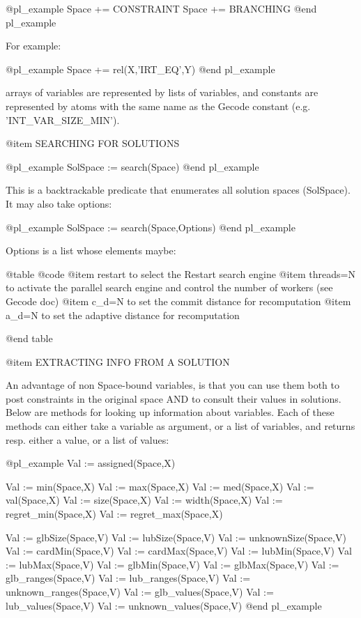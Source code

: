 @pl_example
    Space += CONSTRAINT
    Space += BRANCHING
@end pl_example

For example:

@pl_example
    Space += rel(X,'IRT_EQ',Y)
@end pl_example


arrays of variables are represented by lists of variables, and constants are
represented by atoms with the same name as the Gecode constant
(e.g. 'INT_VAR_SIZE_MIN').

@item SEARCHING FOR SOLUTIONS

@pl_example
    SolSpace := search(Space)
@end pl_example


This is a backtrackable predicate that enumerates all solution spaces
(SolSpace).  It may also take options:

@pl_example
    SolSpace := search(Space,Options)
@end pl_example


Options is a list whose elements maybe:

@table @code
@item restart
    to select the Restart search engine
@item threads=N
    to activate the parallel search engine and control the number of
    workers (see Gecode doc)
@item c_d=N
    to set the commit distance for recomputation
@item a_d=N
    to set the adaptive distance for recomputation

@end table

@item EXTRACTING INFO FROM A SOLUTION

An advantage of non Space-bound variables, is that you can use them both to
post constraints in the original space AND to consult their values in
solutions.  Below are methods for looking up information about variables.  Each
of these methods can either take a variable as argument, or a list of
variables, and returns resp. either a value, or a list of values:

@pl_example
    Val := assigned(Space,X)

    Val := min(Space,X)
    Val := max(Space,X)
    Val := med(Space,X)
    Val := val(Space,X)
    Val := size(Space,X)
    Val := width(Space,X)
    Val := regret_min(Space,X)
    Val := regret_max(Space,X)

    Val := glbSize(Space,V)
    Val := lubSize(Space,V)
    Val := unknownSize(Space,V)
    Val := cardMin(Space,V)
    Val := cardMax(Space,V)
    Val := lubMin(Space,V)
    Val := lubMax(Space,V)
    Val := glbMin(Space,V)
    Val := glbMax(Space,V)
    Val := glb_ranges(Space,V)
    Val := lub_ranges(Space,V)
    Val := unknown_ranges(Space,V)
    Val := glb_values(Space,V)
    Val := lub_values(Space,V)
    Val := unknown_values(Space,V)
 @end pl_example

